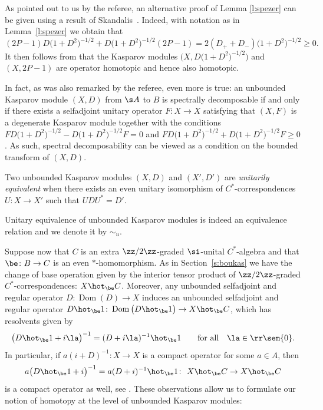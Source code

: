\begin{rem}As pointed out to us by the referee, an alternative proof of Lemma \ref{l:spezer} can be given using a result of Skandalis~\cite[Lemma~11]{Ska:SRK}. Indeed, with notation as in Lemma~\ref{l:spezer} we obtain that
\[
(2P-1) D\big(1 + D^2\big)^{-1/2} + D\big(1 + D^2\big)^{-1/2} (2P-1) = 2(D_+ + D_-)\big(1 + D^2\big)^{-1/2} \geq 0 .
\]
It then follows from \cite[Lemma~11]{Ska:SRK} that the Kasparov modules $\big(X,D\big(1 + D^2\big)^{-1/2}\big)$ and \mbox{$(X,2P-1)$} are operator homotopic and hence also homotopic.

In fact, as was also remarked by the referee, even more is true: an unbounded Kasparov module $(X,D)$ from $\s A$ to $B$ is spectrally decomposable if and only if there exists a selfadjoint unitary operator $F\colon X \to X$ satisfying that $(X,F)$ is a degenerate Kasparov module together with the conditions $F D\big(1+D^2\big)^{-1/2} - D\big(1+D^2\big)^{-1/2} F = 0$ and $F D\big(1+D^2\big)^{-1/2} + D\big(1+D^2\big)^{-1/2} F \geq 0$. As such, spectral decomposability can be viewed as a condition on the bounded transform of $(X,D)$.
\end{rem}

\begin{dfn}Two unbounded Kasparov modules $(X,D)$ and $(X',D')$ are \emph{unitarily equivalent} when there exists an even unitary isomorphism of $C^*$-correspondences $U\colon X \to X'$ such that $U D U^* = D'$.
\end{dfn}

Unitary equivalence of unbounded Kasparov modules is indeed an equivalence relation and we denote it by $\sim_u$.

Suppose now that $C$ is an extra $\zz/2\zz$-graded $\si$-unital $C^*$-algebra and that $\be\colon B \to C$ is an even $*$-homomorphism. As in Section~\ref{s:boukas} we have the change of base operation given by the interior tensor product of $\zz/2\zz$-graded $C^*$-correspondences: $X \hot_\be C$. Moreover, any unbounded selfadjoint and regular operator $D\colon \operatorname{Dom}(D) \to X$ induces an unbounded selfadjoint and regular operator $D \hot_\be 1\colon \operatorname{Dom}\big(D \hot_\be 1\big) \to X \hot_\be C$, which has resolvents given by
\[
\big( D \hot_\be 1 + i \la \big)^{-1} = (D + i \la)^{-1} \hot_\be 1 \qquad \text{for all} \quad \la \in \rr \sem \{0\} .
\]
In particular, if $a (i + D)^{-1}\colon X \to X$ is a compact operator for some $a \in A$, then
\[
a \big(D \hot_\be 1 + i\big)^{-1} = a (D + i)^{-1} \hot_\be 1\colon \ X \hot_\be C \to X \hot_\be C
\]
is a compact operator as well, see \cite[Proposition~4.7]{Lan:HCM}. These observations allow us to formulate our notion of homotopy at the level of unbounded Kasparov modules:


